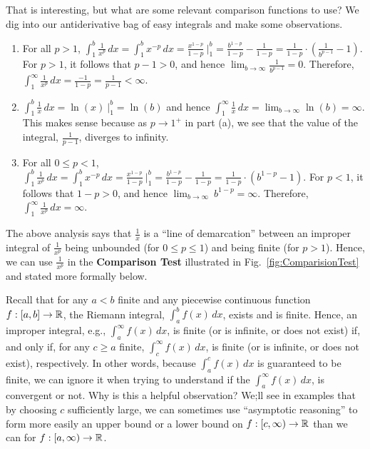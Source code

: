  That is interesting, but what are some relevant comparison functions to use? We dig into our antiderivative bag of easy integrals and make some observations.
\begin{enumerate}
\renewcommand{\labelenumi}{(\alph{enumi})}
\setlength{\itemsep}{.2cm}

    \item For all $p>1$, $\int_1^b \frac{1}{x^p} \, dx = \int_1^b x^{-p} \, dx = \frac{x^{1-p}}{1-p}~\bigg|_1^b = \frac{b^{1-p}}{1-p} - \frac{1}{1-p} = \frac{1}{1-p} \cdot \left(\frac{1}{b^{p-1}} -1 \right) $. 
    For $p>1$, it follows that $p-1 >0$, and hence  ${\displaystyle \lim_{b \to \infty}} \frac{1}{b^{p-1}} = 0$. Therefore,  $\int_1^\infty \frac{1}{x^p} \, dx  = \frac{-1}{1-p} = \frac{1}{p-1}< \infty$.
    

        
    \item $\int_1^b \frac{1}{x} \, dx = \ln(x)~\bigg|_1^b = \ln(b)$ and hence $\int_1^\infty \frac{1}{x} \, dx = \displaystyle \lim_{b \to \infty} \ln(b) = \infty$. This makes sense because as $p \to 1^+$ in part (a), we see that the value of the integral, $\frac{1}{p-1}$, diverges to infinity.
    
    \item For all $0 \le p < 1$,  $\int_1^b \frac{1}{x^p} \, dx = \int_1^b x^{-p} \, dx = \frac{x^{1-p}}{1-p}~\bigg|_1^b = \frac{b^{1-p}}{1-p} - \frac{1}{1-p} = \frac{1}{1-p} \cdot \left(b^{1-p} -1 \right) $.  For $p<1$, it follows that $1-p >0$, and hence  ${\displaystyle \lim_{b \to \infty}} ~b^{1-p} = \infty$. Therefore,  $\int_1^\infty \frac{1}{x^p} \, dx  = \infty$.

\end{enumerate}

The above analysis says that $\frac{1}{x}$ is a  ``line of demarcation'' between an improper integral of $\frac{1}{x^p}$ being unbounded (for $0\le p \le 1$) and being finite (for $p>1$). Hence, we can use $\frac{1}{x^p}$ in the \textbf{Comparison Test} illustrated in Fig.~\ref{fig:ComparisionTest} and stated more formally below.

\bigskip
Recall that for any $a < b$ finite and any piecewise continuous function $f:[a, b] \to \mathbb R$, the Riemann integral, $\int_a^b f(x) \, dx$, exists and is finite. Hence, an improper integral, e.g., $\int_a^\infty f(x) \, dx$, is finite (or is infinite, or does not exist) if, and only if, for any $c\ge a$ finite, $\int_c^\infty f(x) \, dx$, is finite (or is infinite, or does not exist), respectively. In other words, because 
$\int_a^c f(x) \, dx$ is guaranteed to be finite, we can ignore it when trying to understand if the $\int_a^\infty f(x) \, dx$, is convergent or not. Why is this a helpful observation? We;ll see in examples that by choosing $c$ sufficiently large, we can sometimes use ``asymptotic reasoning'' to form more easily an upper bound or a lower bound on $f:[c, \infty) \to \mathbb R$ than we can for $f:[a, \infty) \to \mathbb R$.
\bigskip

